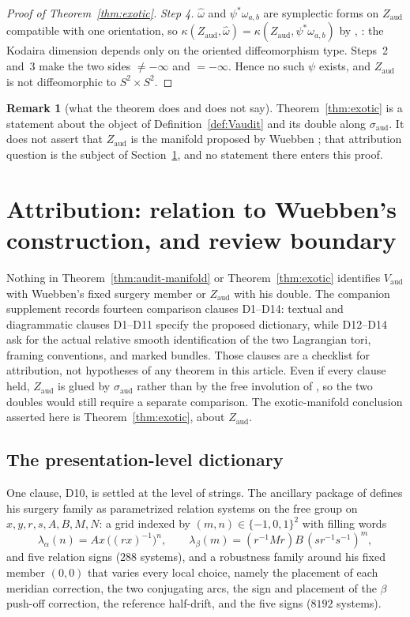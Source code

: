 \documentclass[11pt]{article}
\theoremstyle{definition}
\newtheorem{remark}[theorem]{Remark}
\begin{document}
\begin{proof}[Proof of Theorem~\ref{thm:exotic}]
\emph{Step 4.}  $\hat\omega$ and $\psi^*\omega_{a,b}$ are symplectic forms
on $Z_{\mathrm{aud}}$ compatible with one orientation, so
$\kappa(Z_{\mathrm{aud}},\hat\omega)=\kappa(Z_{\mathrm{aud}},\psi^*\omega_{a,b})$
by \cite{Li}, \cite[p.~251]{LiClay}: the Kodaira dimension depends only on
the oriented diffeomorphism type.  Steps~2 and~3 make the two sides
$\ne-\infty$ and $=-\infty$.  Hence no such $\psi$ exists, and
$Z_{\mathrm{aud}}$ is not diffeomorphic to $S^2\times S^2$.
\end{proof}

\begin{remark}[what the theorem does and does not say]
Theorem~\ref{thm:exotic} is a statement about the object of
Definition~\ref{def:Vaudit} and its double along $\sigma_{\mathrm{aud}}$.
It does not assert that $Z_{\mathrm{aud}}$ is the manifold proposed by
Wuebben \cite{Wuebben}; that attribution question is the subject of
Section~\ref{sec:relation}, and no statement there enters this proof.
\end{remark}

\section{Attribution: relation to Wuebben's construction, and review
boundary}
\label{sec:relation}

Nothing in Theorem~\ref{thm:audit-manifold} or Theorem~\ref{thm:exotic}
identifies $V_{\mathrm{aud}}$ with Wuebben's fixed surgery member or
$Z_{\mathrm{aud}}$ with his double.  The companion supplement records
fourteen comparison clauses D1--D14: textual and diagrammatic clauses
D1--D11 specify the proposed dictionary, while D12--D14 ask for the actual
relative smooth identification of the two Lagrangian tori, framing
conventions, and marked bundles.  Those clauses are a checklist for
attribution, not hypotheses of any theorem in this article.  Even if every
clause held, $Z_{\mathrm{aud}}$ is glued by $\sigma_{\mathrm{aud}}$ rather
than by the free involution of \cite{LidmanPiccirillo}, so the two doubles
would still require a separate comparison.  The exotic-manifold conclusion
asserted here is Theorem~\ref{thm:exotic}, about $Z_{\mathrm{aud}}$.

\subsection{The presentation-level dictionary}
\label{sec:dictionary}

One clause, D10, is settled at the level of strings.  The ancillary package
of \cite{Wuebben} defines his surgery family as parametrized relation
systems on the free group on $x,y,r,s,A,B,M,N$: a grid indexed by
$(m,n)\in\{-1,0,1\}^2$ with filling words
\[
 \lambda_\alpha(n)=Ax\,\bigl((rx)^{-1}\bigr)^{n},\qquad
 \lambda_\beta(m)=(r^{-1}Mr)B\,(sr^{-1}s^{-1})^{m},
\]
and five relation signs ($288$ systems), and a robustness family around his
fixed member $(0,0)$ that varies every local choice, namely the placement of
each meridian correction, the two conjugating arcs, the sign and placement
of the $\beta$ push-off correction, the reference half-drift, and the five
signs ($8192$ systems).
\end{document}
